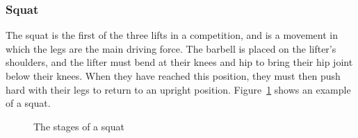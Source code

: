 \subsubsection{Squat}

The squat is the first of the three lifts in a competition, and is a movement in which the legs are the main driving force. The barbell is placed on the lifter’s shoulders, and the lifter must bend at their knees and hip to bring their hip joint below their knees. When they have reached this position, they must then push hard with their legs to return to an upright position. Figure~\ref{fig:squat_stages} shows an example of a squat.

\begin{figure}[H]
    \centering
\caption{The stages of a squat}
\label{fig:squat_stages}
\end{figure}

